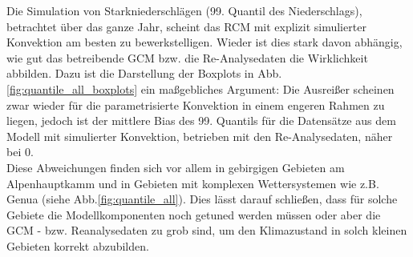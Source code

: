 Die Simulation von Starkniederschlägen (99. Quantil des Niederschlags), betrachtet über das ganze Jahr, scheint das RCM mit explizit simulierter Konvektion am besten zu bewerkstelligen. Wieder ist dies stark davon abhängig, wie gut das betreibende GCM bzw. die Re-Analysedaten die Wirklichkeit abbilden. Dazu ist die Darstellung der Boxplots in Abb.\ref{fig:quantile_all_boxplots} ein maßgebliches Argument: Die Ausreißer scheinen zwar wieder für die parametrisierte Konvektion in einem engeren Rahmen zu liegen, jedoch ist der mittlere Bias des 99. Quantils für die Datensätze aus dem Modell mit simulierter Konvektion, betrieben mit den Re-Analysedaten, näher bei 0.\\
Diese Abweichungen finden sich vor allem in gebirgigen Gebieten am Alpenhauptkamm und in Gebieten mit komplexen Wettersystemen wie z.B. Genua (siehe Abb.\ref{fig:quantile_all}). Dies lässt darauf schließen, dass für solche Gebiete die Modellkomponenten noch getuned werden müssen oder aber die GCM - bzw. Reanalysedaten zu grob sind, um den Klimazustand in solch kleinen Gebieten korrekt abzubilden.\vspace{1pt}\\

